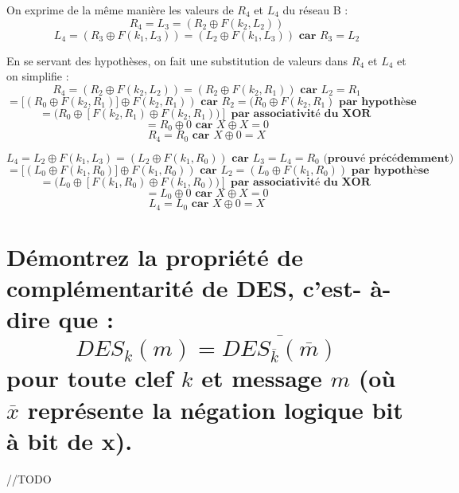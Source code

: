 \documentclass[fleqn]{article}
\begin{document}
On exprime de la même manière les valeurs de $R_4$ et $L_4$ du réseau B :
\[R_4 = L_3 = \boxed{(R_2 \oplus F(k_2, L_2))}\]
\[L_4 = (R_3 \oplus F(k_1, L_3)) = \boxed{(L_2 \oplus F(k_1, L_3))} \textbf{ car } R_3 = L_2\]\newline

En se servant des hypothèses, on fait une substitution de valeurs dans $R_4$ et $L_4$ et on simplifie :
\[R_4 = (R_2 \oplus F(k_2, L_2)) = (R_2 \oplus F(k_2, R_1)) \textbf{ car } L_2 = R_1\]
\[= [(R_0 \oplus F(k_2, R_1)] \oplus F(k_2, R_1)) \textbf{ car } R_2 = (R_0 \oplus F(k_2, R_1) \textbf{ par hypothèse}\]
\[= (R_0 \oplus [F(k_2, R_1) \oplus F(k_2, R_1))] \textbf{ par associativité du XOR }\]
\[= R_0 \oplus 0 \textbf{ car } X \oplus X = 0\]
\[\boxed{R_4 = R_0} \textbf{ car } X \oplus 0 = X\]

\[L_4 = L_2 \oplus F(k_1, L_3) = (L_2 \oplus F(k_1, R_0)) \textbf{ car } L_3 = L_4 = R_0 \textbf{ (prouvé précédemment)}\]
\[= [(L_0 \oplus F(k_1, R_0)] \oplus F(k_1, R_0)) \textbf{ car } L_2 = (L_0 \oplus F(k_1, R_0)) \textbf{ par hypothèse}\]
\[= (L_0 \oplus [F(k_1, R_0) \oplus F(k_1, R_0))] \textbf{ par associativité du XOR }\]
\[= L_0 \oplus 0 \textbf{ car } X \oplus X = 0\]
\[\boxed{L_4 = L_0} \textbf{ car } X \oplus 0 = X\]

\section{\normalsize  D\'{e}montrez la propri\'{e}t\'{e} de compl\'{e}mentarit\'{e} de DES, c'est- \`{a}-dire que :
$$
DES_{k}(m)=\overline{DES_{\overline{k}}(\overline{m})}
$$
pour toute clef $k$ et message $m$ (o\`{u} $\overline{x}$ repr\'{e}sente la n\'{e}gation logique bit \`{a} bit de x).}

//TODO

\section{\normalsize}
\end{document}
